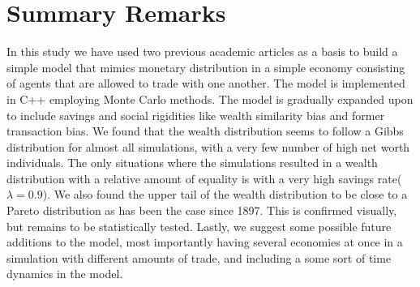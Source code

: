 \documentclass[10pt, a4paper]{amsart}
\begin{document}
\section{Summary Remarks}
In this study we have used two previous academic articles\cite{Patriarca}\cite{GoswamiSen} as a basis to build a simple model that mimics monetary distribution in a simple economy consisting of agents that are allowed to trade with one another. The model is implemented in C++ employing Monte Carlo methods. The model is gradually expanded upon to include savings and social rigidities like wealth similarity bias and former transaction bias. We found that the wealth distribution seems to follow a Gibbs distribution for almost all simulations, with a very few number of high net worth individuals. The only situations where the simulations resulted in a wealth distribution with a relative amount of equality is with a very high savings rate($\lambda=0.9$). We also found the upper tail of the wealth distribution to be close to a Pareto distribution as has been the case since 1897\cite{Pareto}. This is confirmed visually, but remains to be statistically tested. Lastly, we suggest some possible future additions to the model, most importantly having several economies at once in a simulation with different amounts of trade, and including a some sort of time dynamics in the model. 
\end{document}
